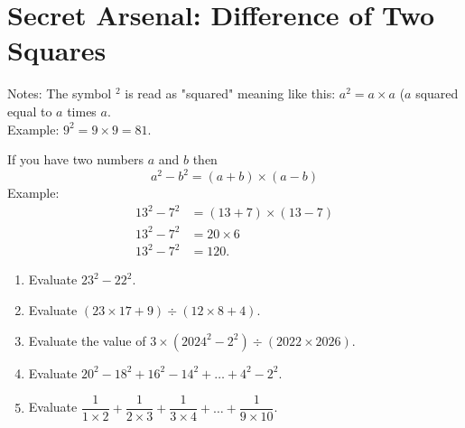 \documentclass[11pt]{scrartcl}
\begin{document}
\section{Secret Arsenal: Difference of Two Squares}
\begin{remark*}
    Notes: The symbol $^2$ is read as "squared" meaning like this: $a^2 = a \times a$ ($a$ squared equal to $a$ times $a$.\\
    Example: $9^2 = 9 \times 9 = 81$.
\end{remark*}
\begin{lemma*}
    If you have two numbers $a$ and $b$ then $$a^2-b^2 = (a+b) \times (a-b)$$
    Example: 
    \begin{align*}
        13^2-7^2 &= (13+7) \times (13-7)\\
        13^2-7^2 &= 20 \times 6\\
        13^2-7^2 &= \boxed{120}.
    \end{align*}
\end{lemma*}
\begin{enumerate}[resume]
    \item Evaluate $23^2-22^2$.
    \vspace{8cm}\item Evaluate $(23 \times 17 + 9) \div (12 \times 8 + 4).$
    \vspace{8cm}\item Evaluate the value of $3 \times (2024^2 - 2^2) \div (2022 \times 2026)$.
    \vspace{8cm}\item Evaluate $20^2-18^2+16^2-14^2+\dots+4^2-2^2$.
    \vspace{8cm}\item Evaluate $\dfrac{1}{1 \times 2} + \dfrac{1}{2 \times 3} + \dfrac{1}{3 \times 4} + \dots + \dfrac{1}{9 \times 10}$.
\end{enumerate}
\end{document}

